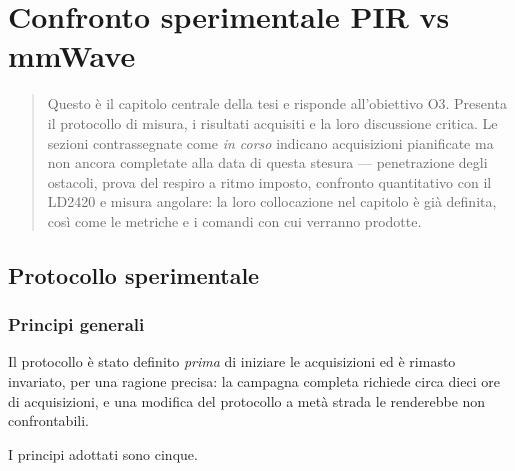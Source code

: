\chapter{Confronto sperimentale PIR vs mmWave}
\label{cap:confronto}

\begin{quote}\small
Questo è il capitolo centrale della tesi e risponde all'obiettivo O3. Presenta il
protocollo di misura, i risultati acquisiti e la loro discussione critica. Le
sezioni contrassegnate come \emph{in corso} indicano acquisizioni pianificate ma
non ancora completate alla data di questa stesura --- penetrazione degli ostacoli,
prova del respiro a ritmo imposto, confronto quantitativo con il LD2420 e misura
angolare: la loro collocazione nel capitolo è già definita, così come le metriche e
i comandi con cui verranno prodotte.
\end{quote}

\section{Protocollo sperimentale}
\label{sec:protocollo}

\subsection{Principi generali}

Il protocollo è stato definito \emph{prima} di iniziare le acquisizioni ed è
rimasto invariato, per una ragione precisa: la campagna completa richiede circa
dieci ore di acquisizioni, e una modifica del protocollo a metà strada le renderebbe
non confrontabili.

I principi adottati sono cinque.

